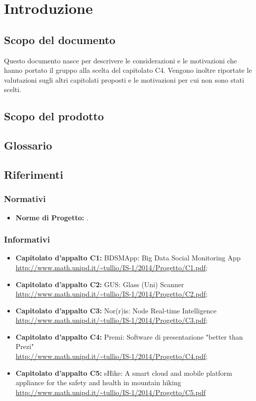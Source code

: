 \section{Introduzione}
\subsection{Scopo del documento}
Questo documento nasce per descrivere le considerazioni e le motivazioni che hanno
portato il gruppo alla scelta del capitolato C4.
Vengono inoltre riportate le valutazioni sugli altri capitolati proposti e le motivazioni
per cui non sono stati scelti.
\subsection{Scopo del prodotto} 
\scopoProdotto

\subsection{Glossario}
\descrizioneGlossario


\subsection{Riferimenti}
\subsubsection{Normativi}
\begin{itemize}
\item \textbf{Norme di Progetto:} \normeDiProgetto.
\end{itemize}

\subsubsection{Informativi}
\begin{itemize}
\item \textbf{Capitolato d'appalto C1:} BDSMApp: Big Data Social Monitoring App
\\\url{http://www.math.unipd.it/~tullio/IS-1/2014/Progetto/C1.pdf};
\item \textbf{Capitolato d'appalto C2:} GUS: Glass (Uni) Scanner
\\\url{http://www.math.unipd.it/~tullio/IS-1/2014/Progetto/C2.pdf};
\item \textbf{Capitolato d'appalto C3:} Nor(r)is: Node Real-time Intelligence
\\\url{http://www.math.unipd.it/~tullio/IS-1/2014/Progetto/C3.pdf};
\item \textbf{Capitolato d'appalto C4:} Premi: Software di presentazione "better than Prezi"
\\\url{http://www.math.unipd.it/~tullio/IS-1/2014/Progetto/C4.pdf};
\item \textbf{Capitolato d'appalto C5:} sHike: A smart cloud and mobile platform appliance for the safety and health in mountain hiking
\\\url{http://www.math.unipd.it/~tullio/IS-1/2014/Progetto/C5.pdf}
\end{itemize}
